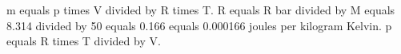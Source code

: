 m equals p times V divided by R times T.  
R equals R bar divided by M equals 8.314 divided by 50 equals 0.166 equals 0.000166 joules per kilogram Kelvin.  
p equals R times T divided by V.